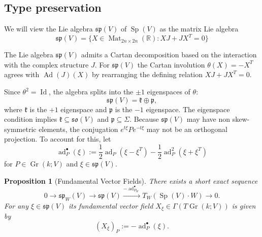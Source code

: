 \documentclass[12pt, final]{article}
\def\R{\mathbb{R}}
\def\ad{\operatorname{ad}}
\def\Ad{\operatorname{Ad}}
\def\Sp{\operatorname{Sp}}
\def\Mat{\operatorname{Mat}}
\def\Gr{\operatorname{Gr}}
\def\Id{\operatorname{Id}}
\def\sp{\mathfrak{sp}}
\def\so{\mathfrak{so}}
\def\k{\mathfrak{k}}
\def\p{\mathfrak{p}}
\newtheorem{proposition}[theorem]{Proposition}
\begin{document}
\subsection{Type preservation}\label{subsec:type_preservation}

We will view the Lie algebra $\sp(V)$ of $\Sp(V)$ as the matrix Lie algebra \[\sp(V) = \{ X \in \Mat_{2n \times 2n}(\R): XJ + JX^T = 0\}\]

The Lie algebra $\sp(V)$ admits a Cartan decomposition based on the interaction with the complex structure $J$. For $\sp(V)$ the Cartan involution $\theta(X) = - X^T$ agrees with $\Ad(J)(X)$ by rearranging the defining relation $XJ + JX^T = 0$. 

Since $\theta^2 = \Id$, the algebra splits into the $\pm 1$ eigenspaces of $\theta$:
\[ \sp(V) = \k \oplus \p, \]
where $\k$ is the $+1$ eigenspace and $\p$ is the $-1$ eigenspace. The eigenspace condition implies $\k \subseteq \so(V)$ and $\p \subseteq \Sigma$. Because $\sp(V)$ may have non skew-symmetric elements, the conjugation $e^{t\xi} P e^{-t\xi}$ may not be an orthogonal projection. To account for this, let
\[ \ad^\bullet_P (\xi) := \frac{1}{2} \ad_P (\xi - \xi^T) - \frac{1}{2} \ad_P^2 (\xi+\xi^T)\]
for $P \in \Gr(k; V)$ and $\xi \in \sp(V)$.
\begin{proposition}[Fundamental Vector Fields]
\label{prop:fundamental_vf}
There exists a short exact sequence
\[ 0 \to \sp_W(V) \to \sp(V) \xrightarrow{-\ad^\bullet_{P_W}} T_{W}(\Sp(V)\cdot W) \to 0.\]
For any $\xi \in \sp(V)$ its fundamental vector field $X_\xi \in \Gamma(T\Gr(k; V))$ is given by
        \[ (X_\xi)_P:= -\ad^\bullet_P(\xi).\]
\end{proposition}
\end{document}
